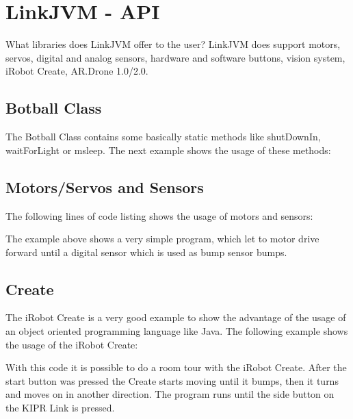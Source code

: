 \documentclass{juniorjournal}
\begin{document}
\section{LinkJVM - API}
What libraries does LinkJVM offer to the user?
LinkJVM does support motors, servos, digital and analog sensors, hardware and 
software buttons, vision system, iRobot Create, AR.Drone 1.0/2.0.

\subsection{Botball Class}
The Botball Class contains some basically static methods like shutDownIn, 
waitForLight or msleep.
The next example shows the usage of these methods:


\subsection{Motors/Servos and Sensors}
The following lines of code listing shows the usage of motors and sensors:

The example above shows a very simple program, which let to motor drive forward 
until a digital sensor which is used as bump sensor bumps.

\subsection{Create}
The iRobot Create is a very good example to show the advantage of the usage of 
an object oriented programming language like Java.
The following example shows the usage of the iRobot Create:

With this code it is possible to do a room tour with the iRobot Create.
After the start button was pressed the Create starts moving until it bumps, then 
it turns and moves on in another direction. The program runs until the side 
button on the KIPR Link is pressed.
\end{document}
